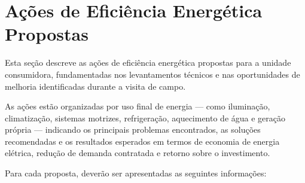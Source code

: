 \chapter{Ações de Eficiência Energética Propostas}
\label{sec:acoes-propostas}

Esta seção descreve as ações de eficiência energética propostas para a unidade consumidora, fundamentadas nos levantamentos técnicos e nas oportunidades de melhoria identificadas durante a visita de campo.

As ações estão organizadas por uso final de energia — como iluminação, climatização, sistemas motrizes, refrigeração, aquecimento de água e geração própria — indicando os principais problemas encontrados, as soluções recomendadas e os resultados esperados em termos de economia de energia elétrica, redução de demanda contratada e retorno sobre o investimento.

Para cada proposta, deverão ser apresentadas as seguintes informações:



